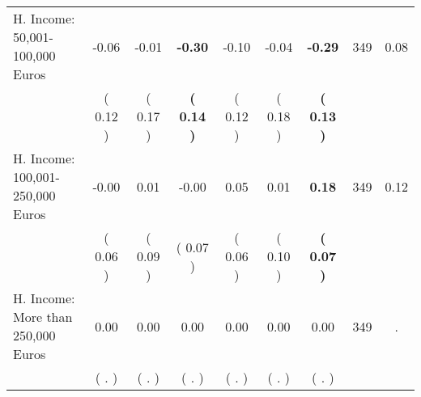 \begin{tabular}{lcccccccc}
H. Income: 50,001-100,000 Euros &     -0.06 &     -0.01 & \textbf{    -0.30} &     -0.10 &     -0.04 & \textbf{    -0.29} & 349 &       0.08 \\ 
 & (     0.12 ) & (     0.17 ) & \textbf{(     0.14 )} & (     0.12 ) & (     0.18 ) & \textbf{(     0.13 )} & \\
H. Income: 100,001-250,000 Euros &     -0.00 &      0.01 &     -0.00 &      0.05 &      0.01 & \textbf{     0.18} & 349 &       0.12 \\ 
 & (     0.06 ) & (     0.09 ) & (     0.07 ) & (     0.06 ) & (     0.10 ) & \textbf{(     0.07 )} & \\
H. Income: More than 250,000 Euros &      0.00 &      0.00 &      0.00 &      0.00 &      0.00 &      0.00 & 349 &          . \\ 
 & (        . ) & (        . ) & (        . ) & (        . ) & (        . ) & (        . ) & \\
\bottomrule
\end{tabular}
